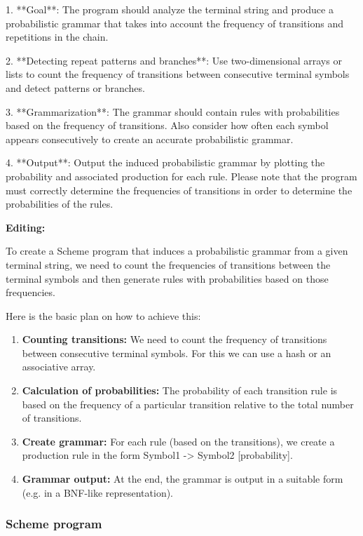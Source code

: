 \documentclass[
]{article}
\begin{document}
1. **Goal**: The program should analyze the terminal string and produce
a probabilistic grammar that takes into account the frequency of
transitions and repetitions in the chain.

2. **Detecting repeat patterns and branches**: Use two-dimensional
arrays or lists to count the frequency of transitions between
consecutive terminal symbols and detect patterns or branches.

3. **Grammarization**: The grammar should contain rules with
probabilities based on the frequency of transitions. Also consider how
often each symbol appears consecutively to create an accurate
probabilistic grammar.

4. **Output**: Output the induced probabilistic grammar by plotting the
probability and associated production for each rule. Please note that
the program must correctly determine the frequencies of transitions in
order to determine the probabilities of the rules.

\textbf{Editing:}

To create a Scheme program that induces a probabilistic grammar from a
given terminal string, we need to count the frequencies of transitions
between the terminal symbols and then generate rules with probabilities
based on those frequencies.

Here is the basic plan on how to achieve this:

\begin{enumerate}
\def\labelenumi{\arabic{enumi}.}
\item
  \textbf{Counting transitions:} We need to count the frequency of
  transitions between consecutive terminal symbols. For this we can use
  a hash or an associative array.
\item
  \textbf{Calculation of probabilities:} The probability of each
  transition rule is based on the frequency of a particular transition
  relative to the total number of transitions.
\item
  \textbf{Create grammar:} For each rule (based on the transitions), we
  create a production rule in the form Symbol1 -\textgreater{} Symbol2
  {[}probability{]}.
\item
  \textbf{Grammar output:} At the end, the grammar is output in a
  suitable form (e.g. in a BNF-like representation).
\end{enumerate}

\subsubsection{\texorpdfstring{\textbf{Scheme
program}}{Scheme program}}\label{scheme-program}
\end{document}
